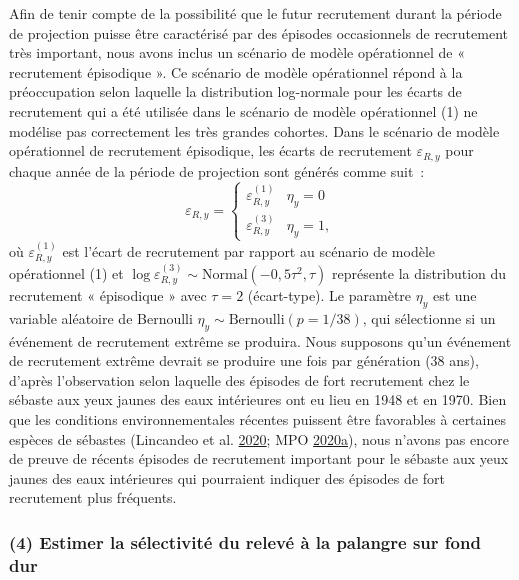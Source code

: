 \documentclass[french,11pt]{book}
\begin{document}
Afin de tenir compte de la possibilité que le futur recrutement durant la période de projection puisse être caractérisé par des épisodes occasionnels de recrutement très important, nous avons inclus un scénario de modèle opérationnel de « recrutement épisodique ». Ce scénario de modèle opérationnel répond à la préoccupation selon laquelle la distribution log-normale pour les écarts de recrutement qui a été utilisée dans le scénario de modèle opérationnel (1) ne modélise pas correctement les très grandes cohortes. Dans le scénario de modèle opérationnel de recrutement épisodique, les écarts de recrutement \(\varepsilon_{R,y}\) pour chaque année de la période de projection sont générés comme suit~:
\begin{equation}
\varepsilon_{R,y} = 
\left\{
\begin{array}{ll}
\varepsilon^{(1)}_{R,y} & \eta_y = 0\\
\varepsilon^{(3)}_{R,y} & \eta_y = 1,
\end{array}
\right.
\end{equation}
où \(\varepsilon^{(1)}_{R,y}\) est l'écart de recrutement par rapport au scénario de modèle opérationnel (1) et \(\log\varepsilon^{(3)}_{R,y} \sim \textrm{Normal}(-0,5\tau^2, \tau)\) représente la distribution du recrutement « épisodique » avec \(\tau = 2\) (écart-type). Le paramètre \(\eta_y\) est une variable aléatoire de Bernoulli \(\eta_y \sim \textrm{Bernoulli}(p = 1/38)\), qui sélectionne si un événement de recrutement extrême se produira. Nous supposons qu'un événement de recrutement extrême devrait se produire une fois par génération (38 ans), d'après l'observation selon laquelle des épisodes de fort recrutement chez le sébaste aux yeux jaunes des eaux intérieures ont eu lieu en 1948 et en 1970. Bien que les conditions environnementales récentes puissent être favorables à certaines espèces de sébastes (Lincandeo et al. \protect\hyperlink{ref-lincandeo2020}{2020}; MPO \protect\hyperlink{ref-haigh2020}{2020}\protect\hyperlink{ref-haigh2020}{a}), nous n'avons pas encore de preuve de récents épisodes de recrutement important pour le sébaste aux yeux jaunes des eaux intérieures qui pourraient indiquer des épisodes de fort recrutement plus fréquents.

\hypertarget{sec:approach3-reference4}{%
\subsubsection{(4) Estimer la sélectivité du relevé à la palangre sur fond dur}\label{sec:approach3-reference4}}
\end{document}
